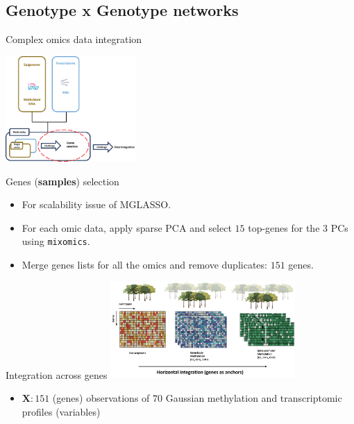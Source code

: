 \documentclass[11pt]{beamer}
\newcommand{\emphase}[1]{\textcolor{Complement}{#1}}
\begin{document}
\subsection{Genotype x Genotype networks}

\begin{frame}{Complex omics data integration}

\centering
\includegraphics[width=5cm]{images/epigenome-transcriptome-feature-selection.png}

\begin{block}{Genes (\textbf{samples}) selection }
\begin{itemize}
\item For scalability issue of MGLASSO. 
\item For each omic data, apply \emphase{sparse PCA} and select $15$ top-genes for the $3$ PCs using \texttt{mixomics}.
\item Merge genes lists for all the omics and remove duplicates: $151$ genes.
\end{itemize}
\end{block}
\end{frame}

\begin{frame}{Integration across genes}
\centering
\includegraphics[width=7cm]{images/horizontal-integration-after-slection.png}

\begin{itemize}
\item $\mathbf X: 151$ (genes) observations of $70$ Gaussian methylation and transcriptomic profiles (variables)
\end{itemize}
\end{frame}
\end{document}
